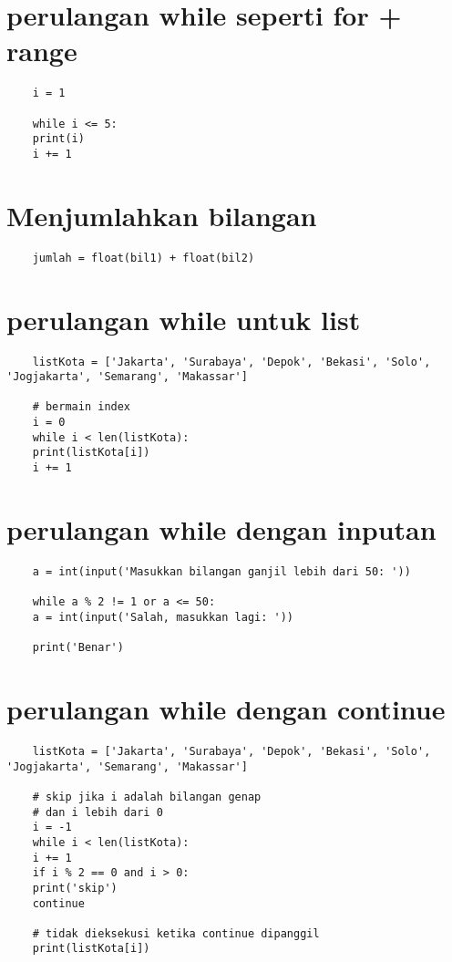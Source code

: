 \documentclass{article}
\begin{document}
\section {perulangan while seperti for + range}
\begin{lstlisting}
	i = 1
	
	while i <= 5:
	print(i)
	i += 1
\end{lstlisting}

\section {Menjumlahkan bilangan}
\begin{lstlisting}
	jumlah = float(bil1) + float(bil2)
\end{lstlisting}

\section {perulangan while untuk list}
\begin{lstlisting}
	listKota = ['Jakarta', 'Surabaya', 'Depok', 'Bekasi', 'Solo', 'Jogjakarta', 'Semarang', 'Makassar']
	
	# bermain index
	i = 0
	while i < len(listKota):
	print(listKota[i])
	i += 1
\end{lstlisting}

\section {perulangan while dengan inputan}
\begin{lstlisting}
	a = int(input('Masukkan bilangan ganjil lebih dari 50: '))
	
	while a % 2 != 1 or a <= 50:
	a = int(input('Salah, masukkan lagi: '))
	
	print('Benar')
\end{lstlisting}

\section {perulangan while dengan continue}
\begin{lstlisting}
	listKota = ['Jakarta', 'Surabaya', 'Depok', 'Bekasi', 'Solo', 'Jogjakarta', 'Semarang', 'Makassar']
	
	# skip jika i adalah bilangan genap
	# dan i lebih dari 0
	i = -1
	while i < len(listKota):
	i += 1
	if i % 2 == 0 and i > 0:
	print('skip')
	continue
	
	# tidak dieksekusi ketika continue dipanggil
	print(listKota[i])
\end{lstlisting}
\end{document}
